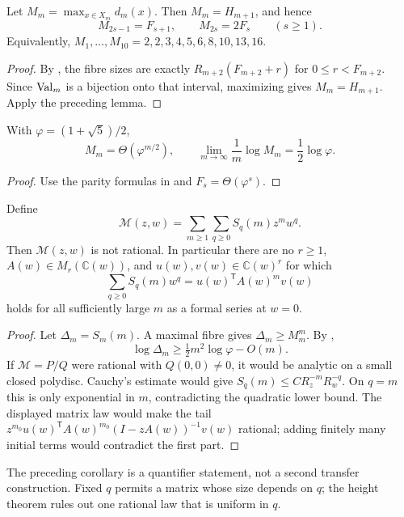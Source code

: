 \begin{theorem}
\label{thm:intrinsic-fold-fibre-height}
Let \(M_m=\max_{x\in X_m}d_m(x)\).  Then \(M_m=H_{m+1}\), and hence
\[
 M_{2s-1}=F_{s+1},\qquad M_{2s}=2F_s\qquad(s\ge1).
\]
Equivalently, \(M_1,\ldots,M_{10}=2,2,3,4,5,6,8,10,13,16\).
\end{theorem}
\begin{proof}
By , the fibre sizes are exactly
\(R_{m+2}(F_{m+2}+r)\) for \(0\le r<F_{m+2}\).  Since \(\operatorname{Val}_m\) is a
bijection onto that interval, maximizing gives \(M_m=H_{m+1}\).  Apply the
preceding lemma.
\end{proof}

\begin{corollary}
\label{cor:linfty-fold-entropy}
With \(\varphi=(1+\sqrt5)/2\),
\[
 M_m=\Theta(\varphi^{m/2}),\qquad
 \lim_{m\to\infty}\frac1m\log M_m=\frac12\log\varphi .
\]
\end{corollary}
\begin{proof}
Use the parity formulas in
 and \(F_s=\Theta(\varphi^s)\).
\end{proof}

\begin{corollary}
\label{cor:intrinsic-all-degree-transfer-obstruction}
Define
\[
 \mathcal M(z,w)=\sum_{m\ge1}\sum_{q\ge0}S_q(m)z^mw^q .
\]
Then \(\mathcal M(z,w)\) is not rational.  In particular there are no
\(r\ge1\), \(A(w)\in M_r(\mathbb C(w))\), and
\(u(w),v(w)\in\mathbb C(w)^r\) for which
\[
 \sum_{q\ge0}S_q(m)w^q=u(w)^{\mathsf T}A(w)^mv(w)
\]
holds for all sufficiently large \(m\) as a formal series at \(w=0\).
\end{corollary}
\begin{proof}
Let \(\Delta_m=S_m(m)\).  A maximal fibre gives
\(\Delta_m\ge M_m^m\).  By
,
\[
 \log\Delta_m\ge \tfrac12m^2\log\varphi-O(m).
\]
If \(\mathcal M=P/Q\) were rational with \(Q(0,0)\ne0\), it would be analytic
on a small closed polydisc.  Cauchy's estimate would give
\(S_q(m)\le C R_z^{-m}R_w^{-q}\).  On \(q=m\) this is only exponential in
\(m\), contradicting the quadratic lower bound.  The displayed matrix law
would make the tail
\(z^{m_0}u(w)^{\mathsf T}A(w)^{m_0}(I-zA(w))^{-1}v(w)\) rational; adding finitely
many initial terms would contradict the first part.
\end{proof}

\begin{remark}
The preceding corollary is a quantifier statement, not a second transfer
construction.  Fixed \(q\) permits a matrix whose size depends on \(q\);
the height theorem rules out one rational law that is uniform in \(q\).

\end{remark}
